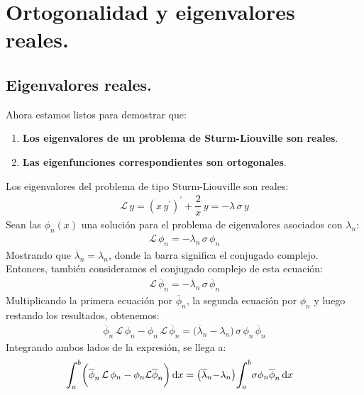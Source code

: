 \documentclass[12pt]{article}
\newcommand{\pderivada}[1]{\ensuremath{{#1}^{\prime}}}
\def\scaleint#1{\vcenter{\hbox{\scaleto[3ex]{\displaystyle\int}{#1}}}}
\def\bs{\mkern-12mu}
\numberwithin{equation}{section}
\begin{document}
\section{Ortogonalidad y eigenvalores reales.}
\subsection{Eigenvalores reales.}

Ahora estamos listos para demostrar que:
\begin{enumerate}
\item \textbf{Los eigenvalores de un problema de Sturm-Liouville son reales}.
\item \textbf{Las eigenfunciones correspondientes son ortogonales}.
\end{enumerate}

Los eigenvalores del problema de tipo Sturm-Liouville son reales:
\begin{align*}
\mathcal{L} \, y = \left( x \, \pderivada{y} \right)^{\prime} + \dfrac{2}{x} \, y = - \lambda \, \sigma \, y
\end{align*}
Sean las $\phi_{n}(x)$ una solución para el problema de eigenvalores asociados con $\lambda_{n}$:
\begin{align*}
\mathcal{L} \, \phi_{n} = - \lambda_{n} \, \sigma \, \phi_{n}
\end{align*}
Mostrando que $\overline{\lambda}_{n} = \lambda_{n}$, donde la barra significa el conjugado complejo. Entonces, también consideramos el conjugado complejo de esta ecuación:
\begin{align*}
\mathcal{L} \, \overline{\phi}_{n} = - \overline{\lambda}_{n} \, \sigma \, \overline{\phi}_{n}
\end{align*}
Multiplicando la primera ecuación por $\overline{\phi}_{n}$, la segunda ecuación por $\phi_{n}$ y luego restando los resultados, obtenemos:
\begin{align*}
\overline{\phi}_{n} \, \mathcal{L} \, \phi_{n} - \phi_{n} \, \mathcal{L} \, \overline{\phi}_{n} = \big( \overline{\lambda}_{n} - \lambda_{n} \big) \, \sigma \, \phi_{n} \, \overline{\phi}_{n}
\end{align*}
Integrando ambos lados de la expresión, se llega a:
\begin{align*}
\scaleint{6ex}_{\bs a}^{b} \bigg( \overline{\phi}_{n} \, \mathcal{L} \, \phi_{n} &- \phi_{n} \mathcal{L} \overline{\phi}_{n} \bigg) \dd{x} =\big( \overline{\lambda}_{n} {-} \lambda_{n} \big) \scaleint{6ex}_{\bs a}^{b} \sigma \phi_{n} \overline{\phi}_{n} \dd{x}
\end{align*}
\end{document}
